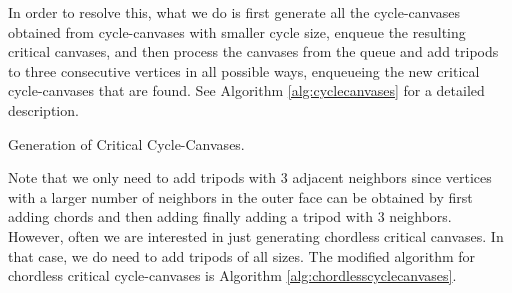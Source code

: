 In order to resolve this, what we do is first generate all the cycle-canvases obtained from cycle-canvases with smaller cycle size, enqueue the resulting critical canvases, and then process the canvases from the queue and add tripods 
to three consecutive vertices in all possible ways, enqueueing the new critical cycle-canvases that are found. See Algorithm \ref{alg:cyclecanvases} for a detailed
description.


\begin{algorithm}
\small
\caption{Generation of Critical Cycle-Canvases.}
\label{alg:cyclecanvases}
\SetAlgoLined
{}



\end{algorithm}



Note that we only need to add tripods with $3$ adjacent neighbors since vertices with a larger number of neighbors in the
outer face can be obtained by first adding chords and then adding finally adding a tripod with $3$ neighbors. However, 
often we are interested in just generating chordless critical canvases. In that case, we do need to add tripods of all sizes.
The modified algorithm for chordless critical cycle-canvases is Algorithm \ref{alg:chordlesscyclecanvases}.


